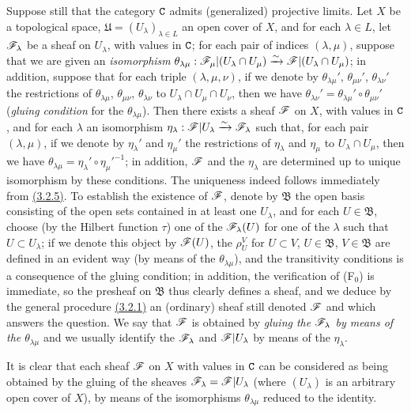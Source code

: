 \begin{env}[3.3.1]
\label{env-0.3.3.1}
Suppose still that the category $\mathtt{C}$ admits (generalized) projective limits. Let
$X$ be a topological space, $\mathfrak{U}=(U_\lambda)_{\lambda\in L}$ an open
cover of $X$, and for each $\lambda\in L$, let $\mathscr{F}_\lambda$ be a sheaf on
$U_\lambda$, with values in $\mathtt{C}$; for each pair of indices $(\lambda,\mu)$,
suppose that we are given an {\em isomorphism}
$\theta_{\lambda\mu}:\mathscr{F}_\mu|(U_\lambda\cap U_\mu)
  \xrightarrow{\sim}\mathscr{F}|(U_\lambda\cap U_\mu)$; in addition, suppose that for each triple
$(\lambda,\mu,\nu)$, if we denote by $\theta_{\lambda\mu}'$, $\theta_{\mu\nu}'$,
$\theta_{\lambda\nu}'$ the restrictions of $\theta_{\lambda\mu}$,
$\theta_{\mu\nu}$, $\theta_{\lambda\nu}$ to $U_\lambda\cap U_\mu\cap U_\nu$,
then we have $\theta_{\lambda\nu}'=\theta_{\lambda\mu}'\circ\theta_{\mu\nu}'$
({\em gluing condition} for the $\theta_{\lambda\mu}$). Then there exists a
sheaf $\mathscr{F}$ on $X$, with values in $\mathtt{C}$, and for each $\lambda$ an
isomorphism $\eta_\lambda:\mathscr{F}|U_\lambda\xrightarrow{\sim}\mathscr{F}_\lambda$ such that, for
each pair $(\lambda,\mu)$, if we denote by $\eta_\lambda'$ and $\eta_\mu'$ the
restrictions of $\eta_\lambda$ and $\eta_\mu$ to $U_\lambda\cap U_\mu$, then we
have $\theta_{\lambda\mu}=\eta_\lambda'\circ{\eta_\mu'}^{-1}$; in addition,
$\mathscr{F}$ and the $\eta_\lambda$ are determined up to unique isomorphism by these
conditions. The uniqueness indeed follows immediately from \hyperref[env-0.3.2.5]{(3.2.5)}. To
establish the existence of $\mathscr{F}$, denote by $\mathfrak{B}$ the open basis
consisting of the open sets contained in at least one $U_\lambda$, and for each
$U\in\mathfrak{B}$, choose (by the Hilbert function $\tau$) one of the
$\mathscr{F}_\lambda(U)$ for one of the $\lambda$ such that $U\subset U_\lambda$; if
we denote this object by $\mathscr{F}(U)$, the $\rho_U^V$ for $U\subset V$,
$U\in\mathfrak{B}$, $V\in\mathfrak{B}$ are defined in an evident way (by means
of the $\theta_{\lambda\mu}$), and the transitivity conditions is a consequence
of the gluing condition; in addition, the verification of (F$_0$) is immediate,
so the presheaf on $\mathfrak{B}$ thus clearly defines a sheaf, and we deduce by
the general procedure \hyperref[env-0.3.2.1]{(3.2.1)} an (ordinary) sheaf still denoted
$\mathscr{F}$ and which answers the question. We say that $\mathscr{F}$ is obtained by
{\em gluing the $\mathscr{F}_\lambda$ by means of the $\theta_{\lambda\mu}$} and we
usually identify the $\mathscr{F}_\lambda$ and $\mathscr{F}|U_\lambda$ by means of the
$\eta_\lambda$.

It is clear that each sheaf $\mathscr{F}$ on $X$ with values in $\mathtt{C}$ can be
considered as being obtained by the gluing of the sheaves
$\mathscr{F}_\lambda=\mathscr{F}|U_\lambda$ (where $(U_\lambda)$ is an arbitrary open
cover of $X$), by means of the isomorphisms $\theta_{\lambda\mu}$ reduced to the
identity.
\end{env}

